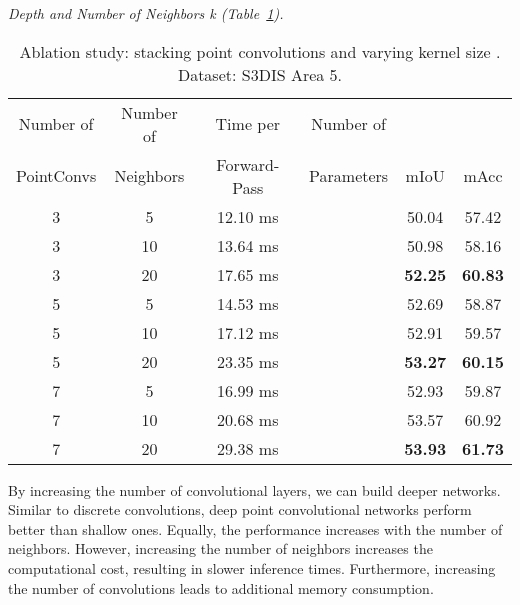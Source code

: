 \documentclass[letterpaper, 10 pt, conference]{ieeeconf}
\newcommand{\reftab}[1]{Table~\ref{tab:#1}}
\newcommand{\parag}[1]{\vspace{0ex} \textit{#1}}
\begin{document}
\parag{Depth and Number of Neighbors \textit{k} (\reftab{segmentation_results_stanford_depth}).}
\begin{table}[b]
\center
\caption{Ablation study: stacking point convolutions and varying kernel size . Dataset: S3DIS Area 5.
}
\resizebox{0.99\columnwidth}{!}
{\setlength{\tabcolsep}{3pt}
\begin{tabular}{cccccc}
\toprule
{Number of}    & {Number of}     & {Time per    }  & {Number of}  &      &\\
{PointConvs} & {Neighbors } & {Forward-Pass} & {Parameters} & {mIoU} & {mAcc}\\
\midrule
3 &  5 & 12.10 ms &  & 50.04 & 57.42\\
3 & 10 & 13.64 ms &  & 50.98 & 58.16\\
3 & 20 & 17.65 ms &  & \textbf{52.25} & \textbf{60.83}\\
\midrule
5 &  5 & 14.53 ms &  & 52.69 & 58.87\\
5 & 10 & 17.12 ms &  & 52.91 & 59.57\\
5 & 20 & 23.35 ms &  & \textbf{53.27} & \textbf{60.15}\\
\midrule
7 &  5 & 16.99 ms &  & 52.93 & 59.87\\
7 & 10 & 20.68 ms &  & 53.57 & 60.92\\
7 & 20 & 29.38 ms &  & \textbf{53.93} & \textbf{61.73}\\
\bottomrule
\end{tabular}
}
\label{tab:segmentation_results_stanford_depth}   
\end{table}
 By increasing the number of convolutional layers, we can build deeper networks.
Similar to discrete convolutions, deep point convolutional networks perform better than shallow ones.
Equally, the performance increases with the number of neighbors.
However, increasing the number of neighbors increases the computational cost, resulting in slower inference times.
Furthermore, increasing the number of convolutions leads to additional memory consumption.
\end{document}

